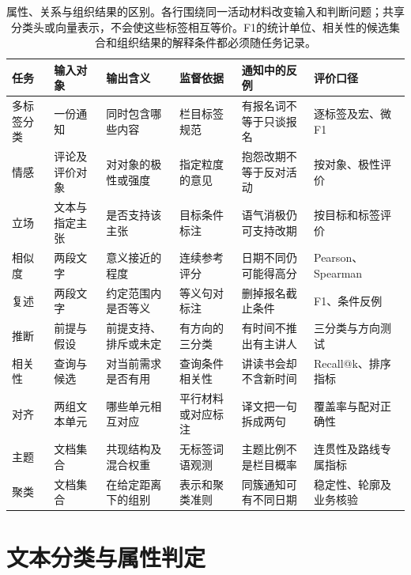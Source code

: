 \begin{table}[htbp]
  \centering
  \begin{tabularx}{\linewidth}{@{}>{\raggedright\arraybackslash}p{16mm}
    >{\raggedright\arraybackslash}p{22mm}>{\raggedright\arraybackslash}X
    >{\raggedright\arraybackslash}p{23mm}>{\raggedright\arraybackslash}X
    >{\raggedright\arraybackslash}p{22mm}@{}}
    \toprule
    任务 & 输入对象 & 输出含义 & 监督依据 & 通知中的反例 & 评价口径 \\
    \midrule
    多标签分类 & 一份通知 & 同时包含哪些内容 & 栏目标签规范 & 有报名词不等于只谈报名 & 逐标签及宏、微F1 \\
    情感 & 评论及评价对象 & 对对象的极性或强度 & 指定粒度的意见 & 抱怨改期不等于反对活动 & 按对象、极性评价 \\
    立场 & 文本与指定主张 & 是否支持该主张 & 目标条件标注 & 语气消极仍可支持改期 & 按目标和标签评价 \\
    相似度 & 两段文字 & 意义接近的程度 & 连续参考评分 & 日期不同仍可能得高分 & Pearson、Spearman \\
    复述 & 两段文字 & 约定范围内是否等义 & 等义句对标注 & 删掉报名截止条件 & F1、条件反例 \\
    推断 & 前提与假设 & 前提支持、排斥或未定 & 有方向的三分类 & 有时间不推出有主讲人 & 三分类与方向测试 \\
    相关性 & 查询与候选 & 对当前需求是否有用 & 查询条件相关性 & 讲读书会却不含新时间 & Recall@k、排序指标 \\
    对齐 & 两组文本单元 & 哪些单元相互对应 & 平行材料或对应标注 & 译文把一句拆成两句 & 覆盖率与配对正确性 \\
    主题 & 文档集合 & 共现结构及混合权重 & 无标签词语观测 & 主题比例不是栏目概率 & 连贯性及路线专属指标 \\
    聚类 & 文档集合 & 在给定距离下的组别 & 表示和聚类准则 & 同簇通知可有不同日期 & 稳定性、轮廓及业务核验 \\
    \bottomrule
  \end{tabularx}
  \caption{属性、关系与组织结果的区别。各行围绕同一活动材料改变输入和判断问题；共享分类头或向量表示，不会使这些标签相互等价。F1的统计单位、相关性的候选集合和组织结果的解释条件都必须随任务记录。}
  \label{tab:nlp-classification-task-meaning}
\end{table}

\FloatBarrier
\section{文本分类与属性判定}
\label{sec:nlp-classification-attributes}

